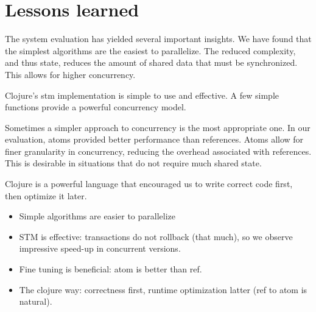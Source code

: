 	\section{Lessons learned}
	\label{sec:lessons-learned}
		The system evaluation has yielded several important insights.  We have found that the simplest algorithms are the easiest to parallelize.  The reduced complexity, and thus state, reduces the amount of shared data that must be synchronized.  This allows for higher concurrency.
		
		Clojure's \gls{stm} implementation is simple to use and effective.  A few simple functions provide a powerful concurrency model.
		
		Sometimes a simpler approach to concurrency is the most appropriate one.  In our evaluation, atoms provided better performance than references.  Atoms allow for finer granularity in concurrency, reducing the overhead associated with references.  This is desirable in situations that do not require much shared state.
		
		Clojure is a powerful language that encouraged us to write correct code first, then optimize it later.  
		\begin{itemize}
			\item Simple algorithms are easier to parallelize
			\item STM is effective: transactions do not rollback (that much), so we observe impressive speed-up in concurrent versions.
			\item Fine tuning is beneficial: atom is better than ref.
			\item The clojure way: correctness first, runtime optimization latter (ref to atom is natural).
		\end{itemize}